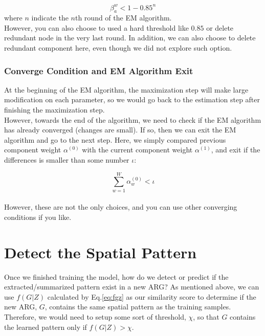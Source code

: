 \begin{equation} 
\beta^w_a < 1 - 0.85^n
\end{equation}
where $n$ indicate the $n$th round of the EM algorithm.\\

However, you can also choose to used a hard threshold like $0.85$ or delete redundant node in the very last round. In addition, we can also choose to delete redundant component here, even though we did not explore such option.

\subsubsection{Converge Condition and EM Algorithm Exit}

At the beginning of the EM algorithm, the maximization step will make large modification on each parameter, so we would go back to the estimation step after finishing the maximization step. \\

However, towards the end of the algorithm, we need to check if the EM algorithm has already converged (changes are small). If so, then we can exit the EM algorithm and go to the next step. Here, we simply compared previous component weight $\alpha^{(0)}$ with the current component weight $\alpha^{(1)}$, and exit if the differences is smaller than some number $\iota$:

\begin{equation} 
\sum^{W}_{w=1}\alpha^{(0)}_w<\iota
\end{equation}\\

However, these are not the only choices, and you can use other converging conditions if you like.\\

\newpage

\section{Detect the Spatial Pattern}

Once we finished training the model, how do we detect or predict if the extracted/summarized pattern exist in a new ARG? As mentioned above, we can use $f(G|Z)$ calculated by Eq.\ref{eq:fgz} as our similarity score to determine if the new ARG, $G$, contains the same spatial pattern as the training samples. Therefore, we would need to setup some sort of threshold, $\chi$, so that $G$ contains the learned pattern only if $f(G|Z)>\chi$.\\ 

